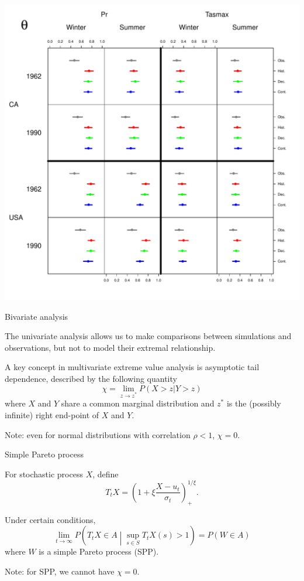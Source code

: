 \documentclass[mathserif, 11pt, t]{beamer}
\begin{document}
\begin{frame}
\begin{center}
\includegraphics[scale=0.34]{figs/theta.pdf}
\end{center}
\end{frame}


\begin{frame}{Bivariate analysis}

The univariate analysis allows us to make comparisons between simulations and observations, but not to model their extremal relationship.
\bigskip

A key concept in multivariate extreme value analysis is asymptotic tail dependence, described by the following quantity
\[ \chi = \lim_{z\rightarrow z^*} P(X > z | Y > z) \]
where $X$ and $Y$ share a common marginal distribution and $z^*$ is the (possibly infinite) right end-point of $X$ and $Y$.
\bigskip

Note: even for normal distributions with correlation $\rho < 1$, $\chi=0$.



\end{frame}

\begin{frame}{Simple Pareto process}

For stochastic process $X$, define
\[ T_t X  = \left(1 + \xi\frac{X - u_t}{\sigma_t}\right)_+^{1/\xi}. \]

Under certain conditions,
\[ \lim_{t\rightarrow\infty} P\left(T_t X \in A \middle| \sup_{s\in S} T_t X(s) > 1\right) = P(W \in A) \]
where $W$ is a simple Pareto process (SPP).
\bigskip

Note: for SPP, we cannot have $\chi=0$.

\end{frame}
\end{document}
